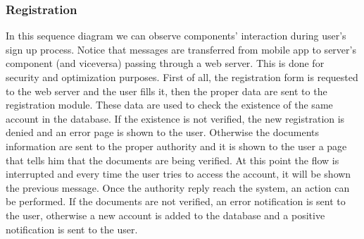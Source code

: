 \documentclass[english]{article}
\begin{document}
		\subsubsection{Registration}
		In this sequence diagram we can observe components' interaction during user's sign up process.
		Notice that messages are transferred from mobile app to server's component (and viceversa) passing through a web server. 		This is done for security and optimization purposes.
		First of all, the registration form is requested to the web server and the user fills it, then the proper data are sent to the registration module.
		These data are used to check the existence of the same account in the database.
		If the existence is not verified, the new registration is denied and an error page is shown to the user. Otherwise the documents information are sent to the proper authority and it is shown to the user a page that tells him that the documents are being verified. At this point the flow is interrupted and every time the user tries to access the account, it will be shown the previous message.
		Once the authority reply reach the system, an action can be performed. If the documents are not verified, an error notification is sent to the user, otherwise a new account is added to the database and a positive notification is sent to the user.
\end{document}
